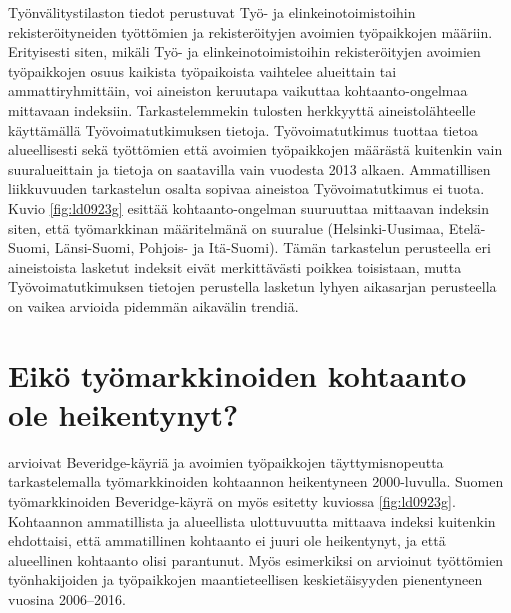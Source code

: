 \documentclass[12pt]{article}
\begin{document}
Työnvälitystilaston tiedot perustuvat Työ- ja elinkeinotoimistoihin rekisteröityneiden työttömien ja rekisteröityjen avoimien työpaikkojen määriin. Erityisesti siten, mikäli Työ- ja elinkeinotoimistoihin rekisteröityjen avoimien työpaikkojen osuus kaikista työpaikoista vaihtelee alueittain tai ammattiryhmittäin, voi aineiston keruutapa vaikuttaa kohtaanto-ongelmaa mittavaan indeksiin. Tarkastelemmekin tulosten herkkyyttä aineistolähteelle käyttämällä Työvoimatutkimuksen tietoja. Työvoimatutkimus tuottaa tietoa alueellisesti sekä työttömien että avoimien työpaikkojen määrästä kuitenkin vain suuralueittain ja tietoja on saatavilla vain vuodesta 2013 alkaen. Ammatillisen liikkuvuuden tarkastelun osalta sopivaa aineistoa Työvoimatutkimus ei tuota. Kuvio \ref{fig:ld0923g} esittää kohtaanto-ongelman suuruuttaa mittaavan indeksin siten, että työmarkkinan määritelmänä on suuralue (Helsinki-Uusimaa, Etelä-Suomi, Länsi-Suomi, Pohjois- ja Itä-Suomi). Tämän tarkastelun perusteella eri aineistoista lasketut indeksit eivät merkittävästi poikkea toisistaan, mutta Työvoimatutkimuksen tietojen perustella lasketun lyhyen aikasarjan perusteella on vaikea arvioida pidemmän aikavälin trendiä.


\section{Eikö työmarkkinoiden kohtaanto ole heikentynyt?} \label{section:eikö työmarkkinoiden kohtaanto ole heikentynyt}

 arvioivat Beveridge-käyriä ja avoimien työpaikkojen täyttymisnopeutta tarkastelemalla työmarkkinoiden kohtaannon heikentyneen 2000-luvulla. Suomen työmarkkinoiden Beveridge-käyrä on myös esitetty kuviossa \ref{fig:ld0923g}. Kohtaannon ammatillista ja alueellista ulottuvuutta mittaava indeksi kuitenkin ehdottaisi, että ammatillinen kohtaanto ei juuri ole heikentynyt, ja että alueellinen kohtaanto olisi parantunut. Myös esimerkiksi  on arvioinut työttömien työnhakijoiden ja työpaikkojen maantieteellisen keskietäisyyden pienentyneen vuosina 2006–2016. 
\end{document}
